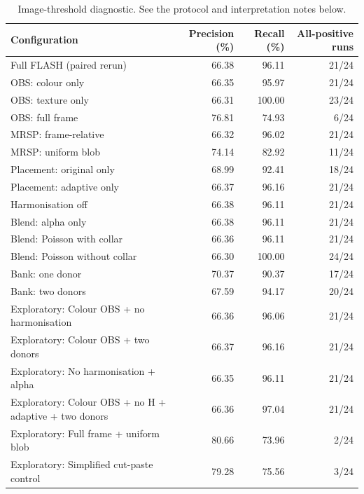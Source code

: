 \begin{table}[t]
\centering
\scriptsize
\caption{Image-threshold diagnostic. See the protocol and interpretation notes below.}
\begin{tabular}{lrrr}
\hline
Configuration & Precision (\%) & Recall (\%) & All-positive runs \\
\hline
Full FLASH (paired rerun) & 66.38 & 96.11 & 21/24 \\
OBS: colour only & 66.35 & 95.97 & 21/24 \\
OBS: texture only & 66.31 & 100.00 & 23/24 \\
OBS: full frame & 76.81 & 74.93 & 6/24 \\
MRSP: frame-relative & 66.32 & 96.02 & 21/24 \\
MRSP: uniform blob & 74.14 & 82.92 & 11/24 \\
Placement: original only & 68.99 & 92.41 & 18/24 \\
Placement: adaptive only & 66.37 & 96.16 & 21/24 \\
Harmonisation off & 66.38 & 96.11 & 21/24 \\
Blend: alpha only & 66.38 & 96.11 & 21/24 \\
Blend: Poisson with collar & 66.36 & 96.11 & 21/24 \\
Blend: Poisson without collar & 66.30 & 100.00 & 24/24 \\
Bank: one donor & 70.37 & 90.37 & 17/24 \\
Bank: two donors & 67.59 & 94.17 & 20/24 \\
Exploratory: Colour OBS + no harmonisation & 66.36 & 96.06 & 21/24 \\
Exploratory: Colour OBS + two donors & 66.37 & 96.16 & 21/24 \\
Exploratory: No harmonisation + alpha & 66.35 & 96.11 & 21/24 \\
Exploratory: Colour OBS + no H + adaptive + two donors & 66.36 & 97.04 & 21/24 \\
Exploratory: Full frame + uniform blob & 80.66 & 73.96 & 2/24 \\
Exploratory: Simplified cut-paste control & 79.28 & 75.56 & 3/24 \\
\hline
\end{tabular}
\end{table}

